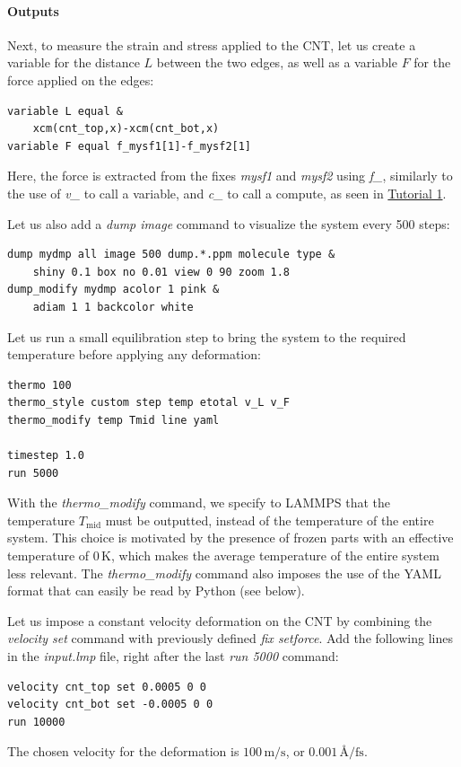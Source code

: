 \documentclass[9pt,tutorial]{livecoms}
\begin{document}
\paragraph{Outputs}
Next, to measure the strain and stress applied to the CNT, let us create a
variable for the distance $L$ between the two edges, as well as  a variable $F$
for the force applied on the edges:
\begin{lstlisting}
variable L equal &
    xcm(cnt_top,x)-xcm(cnt_bot,x)
variable F equal f_mysf1[1]-f_mysf2[1]
\end{lstlisting}
Here, the force is extracted from the fixes \textit{mysf1} and \textit{mysf2}
using \textit{f\_}, similarly to the use of \textit{v\_} to call a variable,
and \textit{c\_} to call a compute, as seen in \hyperref[lennard-jones-label]{Tutorial 1}.

Let us also add a \textit{dump image} command to visualize the system
every 500 steps:
\begin{lstlisting}
dump mydmp all image 500 dump.*.ppm molecule type &
    shiny 0.1 box no 0.01 view 0 90 zoom 1.8
dump_modify mydmp acolor 1 pink &
    adiam 1 1 backcolor white
\end{lstlisting}
Let us run a small equilibration step to bring the system to the required
temperature before applying any deformation:
\begin{lstlisting}
thermo 100
thermo_style custom step temp etotal v_L v_F
thermo_modify temp Tmid line yaml

timestep 1.0
run 5000
\end{lstlisting}
With the \textit{thermo\_modify} command, we specify to LAMMPS that the
temperature $T_\mathrm{mid}$ must be outputted, instead of the
temperature of the entire system. This choice is motivated by the presence of
frozen parts with an effective temperature of 0\,K, which makes the average
temperature of the entire system less relevant. The \textit{thermo\_modify}
command also imposes the use of the YAML format that can easily be read by
Python (see below).

Let us impose a constant velocity deformation on the CNT
by combining the \textit{velocity set} command with previously defined
\textit{fix setforce}. Add the following lines in the \textit{input.lmp} file,
right after the last \textit{run 5000} command:
\begin{lstlisting}
velocity cnt_top set 0.0005 0 0
velocity cnt_bot set -0.0005 0 0
run 10000
\end{lstlisting}
The chosen velocity for the deformation is $100\,\text{m/s}$, or
$0.001\,\text{\AA{}/fs}$.
\end{document}
